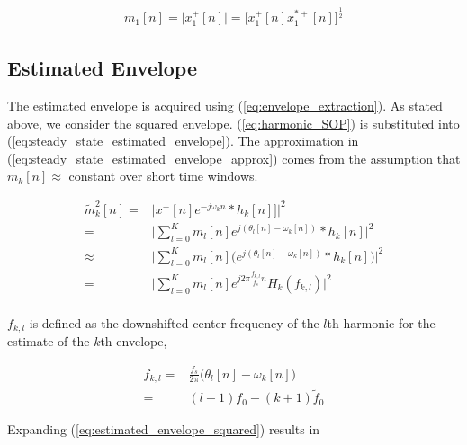 \documentclass [11pt, proquest,oneside] {ganter_thesis}[2015/03/03]
\begin{document}
\begin{align}
\label{eq:square_root_relationship}
m_1[n] = \Big|x^+_1[n]\Big| = \Big[ x^+_1[n] x^{*+}_1[n] \Big]^\frac{1}{2}
\end{align}

\subsection{Estimated Envelope}

The estimated envelope is acquired using (\ref{eq:envelope_extraction}).  As stated above, we consider the squared envelope.  (\ref{eq:harmonic_SOP}) is substituted into (\ref{eq:steady_state_estimated_envelope}).  The approximation in (\ref{eq:steady_state_estimated_envelope_approx}) comes from the assumption that $m_k[n] \approx$ constant over short time windows.

\begin{align}
\label{eq:steady_state_estimated_envelope}
\tilde{m}_k^2[n] =& \Big| x^+[n]e^{-j \omega_kn} * h_k[n]]  \Big|^2 \\
%
=& \Bigg|  \sum\limits_{l=0}^K m_l[n]e^{j(\theta_l[n] - \omega_k[n])}*h_k[n] \Bigg|^2 \\
%
\label{eq:steady_state_estimated_envelope_approx}
\approx& \Bigg|  \sum\limits_{l=0}^K m_l[n] \Big(e^{j(\theta_l[n] - \omega_k[n])}*h_k[n] \Big) \Bigg|^2  \\
%
\label{eq:estimated_envelope_squared}
=& \Bigg|  \sum\limits_{l=0}^K m_l[n] e^{j2\pi\frac{f_{k,l}}{f_s}n} H_k(f_{k,l}) \Bigg|^2 \\
%
\end{align}

$f_{k,l}$ is defined as the downshifted center frequency of the $l$th harmonic for the estimate of the $k$th envelope,

\begin{align}
\label{eq:downshift_radian_frequency}
f_{k,l} =& \frac{f_s}{2\pi}\Big(\theta_l[n] - \omega_k[n]\Big) \nonumber \\
=& (l+1)f_0 - (k+1)\tilde{f}_0
\end{align}

Expanding (\ref{eq:estimated_envelope_squared}) results in
\end{document}
